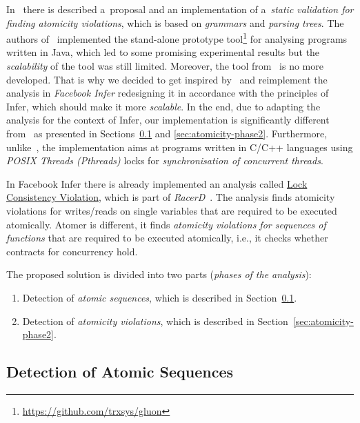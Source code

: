 \documentclass{ExcelAtFIT}
\begin{document}
In~\cite{atomicity-contracts} there is described
a~proposal and an implementation of a~\emph{static
validation for finding atomicity violations},
which is based on \emph{grammars} and
\emph{parsing trees}. The authors
of~\cite{atomicity-contracts} implemented
the stand-alone prototype
tool\footnote{\url{https://github.com/trxsys/gluon}} for
analysing programs written in Java, which
led to some promising experimental results but the
\emph{scalability} of the tool was still limited. Moreover,
the tool from~\cite{atomicity-contracts} is no more
developed. That is why we decided to get inspired
by~\cite{atomicity-contracts} and reimplement the
analysis in \emph{Facebook Infer} redesigning it in
accordance with the principles of Infer, which
should make it more \emph{scalable}. In the end,
due to adapting the analysis for the context of Infer,
our implementation is significantly different
from~\cite{atomicity-contracts} as presented in
Sections~\ref{sec:atomicity-phase1} and \ref{sec:atomicity-phase2}.
Furthermore, unlike~\cite{atomicity-contracts},
the implementation aims at programs written in
C/C++ languages using \emph{POSIX Threads (Pthreads)}
locks for \emph{synchronisation of concurrent
threads}.

In Facebook Infer there is already implemented
an analysis called
\href{https://fbinfer.com/docs/checkers-bug-types.html\#LOCK_CONSISTENCY_VIOLATION}{Lock Consistency Violation},
which is part of \emph{RacerD}~\cite{racerd}.
The analysis finds atomicity violations
for writes/reads on single variables that are
required to be executed atomically. Atomer is
different, it finds \emph{atomicity
violations for sequences of functions} that are
required to be executed atomically, i.e., it
checks whether contracts for concurrency hold.

The proposed solution is divided into two parts
(\emph{phases of the analysis}):
\begin{enumerate}[
    label={\textbf{Phase \arabic*}},
    leftmargin=1.5cm,
    topsep=0.4em
]
    \item
        Detection of \emph{atomic sequences},
        which is described in
        Section~\ref{sec:atomicity-phase1}.

    \item
        Detection of \emph{atomicity violations},
        which is described in
        Section~\ref{sec:atomicity-phase2}.
\end{enumerate}

\subsection{Detection of Atomic Sequences}
\label{sec:atomicity-phase1}
\end{document}

